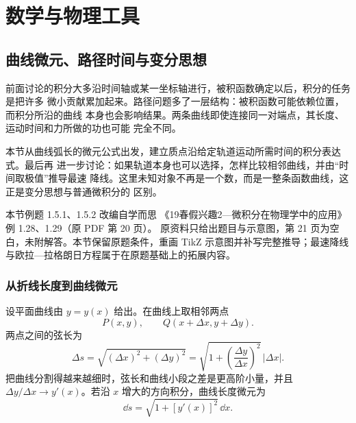\documentclass[UTF8,zihao=-4,oneside,openany]{ctexbook}
\begin{document}
\setcounter{page}{1}
\setcounter{chapter}{0}
\chapter{数学与物理工具}
\setcounter{section}{4}
\fi
\ifdefined\MASTERBOOK\clearpage\fi
\section{曲线微元、路径时间与变分思想}

前面讨论的积分大多沿时间轴或某一坐标轴进行，被积函数确定以后，积分的任务是把许多
微小贡献累加起来。路径问题多了一层结构：被积函数可能依赖位置，而积分所沿的曲线
本身也会影响结果。两条曲线即使连接同一对端点，其长度、运动时间和力所做的功也可能
完全不同。

本节从曲线弧长的微元公式出发，建立质点沿给定轨道运动所需时间的积分表达式。最后再
进一步讨论：如果轨道本身也可以选择，怎样比较相邻曲线，并由“时间取极值”推导最速
降线。这里未知对象不再是一个数，而是一整条函数曲线，这正是变分思想与普通微积分的
区别。

\begin{sourcebox}
本节例题 1.5.1、1.5.2 改编自学而思
《19春假兴趣2—微积分在物理学中的应用》例 1.28、1.29（原 PDF 第 20 页）。
原资料只给出题目与示意图，第 21 页为空白，未附解答。本节保留原题条件，重画 TikZ
示意图并补写完整推导；最速降线与欧拉—拉格朗日方程属于在原题基础上的拓展内容。
\end{sourcebox}

\subsection{从折线长度到曲线微元}

设平面曲线由 $y=y(x)$ 给出。在曲线上取相邻两点
\[
  P(x,y),
  \qquad
  Q(x+\Delta x,y+\Delta y).
\]
两点之间的弦长为
\begin{equation}
  \Delta s=\sqrt{(\Delta x)^2+(\Delta y)^2}
  =\sqrt{1+\left(\frac{\Delta y}{\Delta x}\right)^2}\,|\Delta x|.
  \label{eq:chord-length}
\end{equation}
把曲线分割得越来越细时，弦长和曲线小段之差是更高阶小量，并且
$\Delta y/\Delta x\to y'(x)$。若沿 $x$ 增大的方向积分，曲线长度微元为
\begin{equation}
  \dd s=\sqrt{1+[y'(x)]^2}\,\dd x.
  \label{eq:arc-length-element}
\end{equation}
\end{document}
